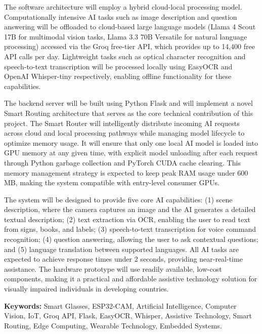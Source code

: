 \documentclass[12pt,a4paper]{report}
\newcommand{\disableborder}{%
\backgroundsetup{contents={}}%
}
\begin{document}
\vspace{0.3cm}
The software architecture will employ a hybrid cloud-local processing model. Computationally intensive AI tasks such as image description and question answering will be offloaded to cloud-based large language models (Llama 4 Scout 17B for multimodal vision tasks, Llama 3.3 70B Versatile for natural language processing) accessed via the Groq free-tier API, which provides up to 14,400 free API calls per day. Lightweight tasks such as optical character recognition and speech-to-text transcription will be processed locally using EasyOCR and OpenAI Whisper-tiny respectively, enabling offline functionality for these capabilities.

\vspace{0.3cm}
The backend server will be built using Python Flask and will implement a novel Smart Routing architecture that serves as the core technical contribution of this project. The Smart Router will intelligently distribute incoming AI requests across cloud and local processing pathways while managing model lifecycle to optimize memory usage. It will ensure that only one local AI model is loaded into GPU memory at any given time, with explicit model unloading after each request through Python garbage collection and PyTorch CUDA cache clearing. This memory management strategy is expected to keep peak RAM usage under 600 MB, making the system compatible with entry-level consumer GPUs.

\vspace{0.3cm}
The system will be designed to provide five core AI capabilities: (1) scene description, where the camera captures an image and the AI generates a detailed textual description; (2) text extraction via OCR, enabling the user to read text from signs, books, and labels; (3) speech-to-text transcription for voice command recognition; (4) question answering, allowing the user to ask contextual questions; and (5) language translation between supported languages. All AI tasks are expected to achieve response times under 2 seconds, providing near-real-time assistance. The hardware prototype will use readily available, low-cost components, making it a practical and affordable assistive technology solution for visually impaired individuals in developing countries.

\vspace{0.3cm}
\textbf{Keywords:} Smart Glasses, ESP32-CAM, Artificial Intelligence, Computer Vision, IoT, Groq API, Flask, EasyOCR, Whisper, Assistive Technology, Smart Routing, Edge Computing, Wearable Technology, Embedded Systems.
\newpage


\disableborder

\pagestyle{chapterpages}
\setcounter{page}{1}









\end{document}
